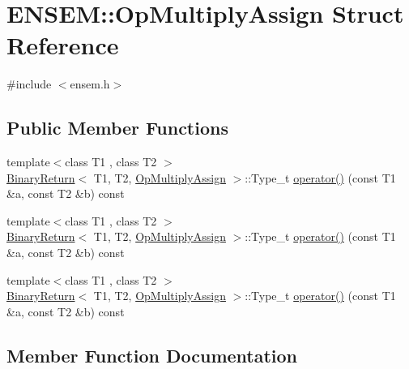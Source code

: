 \hypertarget{structENSEM_1_1OpMultiplyAssign}{}\section{E\+N\+S\+EM\+:\+:Op\+Multiply\+Assign Struct Reference}
\label{structENSEM_1_1OpMultiplyAssign}


{\ttfamily \#include $<$ensem.\+h$>$}

\subsection*{Public Member Functions}
\begin{DoxyCompactItemize}
\item 
{\footnotesize template$<$class T1 , class T2 $>$ }\\\mbox{\hyperlink{structENSEM_1_1BinaryReturn}{Binary\+Return}}$<$ T1, T2, \mbox{\hyperlink{structENSEM_1_1OpMultiplyAssign}{Op\+Multiply\+Assign}} $>$\+::Type\+\_\+t \mbox{\hyperlink{structENSEM_1_1OpMultiplyAssign_a066c102dbdd6eade3f255958de954a16}{operator()}} (const T1 \&a, const T2 \&b) const
\item 
{\footnotesize template$<$class T1 , class T2 $>$ }\\\mbox{\hyperlink{structENSEM_1_1BinaryReturn}{Binary\+Return}}$<$ T1, T2, \mbox{\hyperlink{structENSEM_1_1OpMultiplyAssign}{Op\+Multiply\+Assign}} $>$\+::Type\+\_\+t \mbox{\hyperlink{structENSEM_1_1OpMultiplyAssign_a066c102dbdd6eade3f255958de954a16}{operator()}} (const T1 \&a, const T2 \&b) const
\item 
{\footnotesize template$<$class T1 , class T2 $>$ }\\\mbox{\hyperlink{structENSEM_1_1BinaryReturn}{Binary\+Return}}$<$ T1, T2, \mbox{\hyperlink{structENSEM_1_1OpMultiplyAssign}{Op\+Multiply\+Assign}} $>$\+::Type\+\_\+t \mbox{\hyperlink{structENSEM_1_1OpMultiplyAssign_a066c102dbdd6eade3f255958de954a16}{operator()}} (const T1 \&a, const T2 \&b) const
\end{DoxyCompactItemize}


\subsection{Member Function Documentation}
\mbox{\label{structENSEM_1_1OpMultiplyAssign_a066c102dbdd6eade3f255958de954a16}} 

